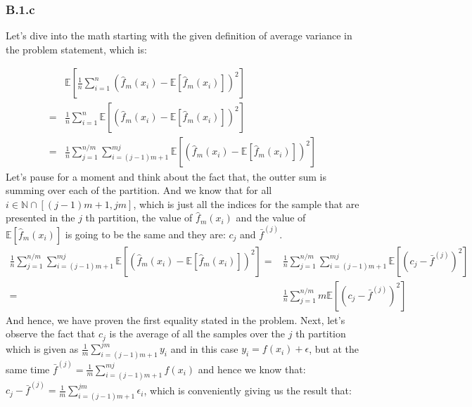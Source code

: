 \documentclass[]{article}
\begin{document}
	\subsubsection*{B.1.c}
		\hspace{1.1em}
		Let's dive into the math starting with the given definition of average variance in the problem statement, which is: 
		\par
		\begin{align*}\tag{B.1.c.1}\label{eqn:B.1.c.1}
			& \mathbb{E}\left[
				\frac{1}{n}
				\sum_{i = 1}^{n}\left(
					\hat{f}_m(x_i) - \mathbb{E}\left[\hat{f}_m(x_i)\right]
				\right)^2
			\right] 
			\\=& 
			\frac{1}{n}
			\sum_{i = 1}^{n}
			\mathbb{E}\left[
				\left(
					\hat{f}_m(x_i) - \mathbb{E}\left[\hat{f}_m(x_i)\right]
				\right)^2
			\right]
			\\
			=&
			\frac{1}{n}\sum_{j = 1}^{n/m}\sum_{i = (j - 1)m + 1}^{mj}
			\mathbb{E}\left[
				\left(
					\hat{f}_m(x_i) - \mathbb{E}\left[\hat{f}_m(x_i)\right]
				\right)^2
			\right]
		\end{align*}
		Let's pause for a moment and think about the fact that, the outter sum is summing over each of the partition. And we know that for all $i\in \mathbb{N}\cap[(j - 1)m + 1, jm]$, which is just all the indices for the sample that are presented in the $j$ th partition, the value of $\hat{f}_m(x_i)$ and the value of $\mathbb{E}\left[\hat{f}_m(x_i)\right]$ is going to be the same and they are: $c_j$ and $\bar{f}^{(j)}$. 
		\begin{align*}\tag{B.1.c.2}\label{eqn:B.1.c.2}
			\frac{1}{n}\sum_{j = 1}^{n/m}\sum_{i = (j - 1)m + 1}^{mj}
			\mathbb{E}\left[
				\left(
					\hat{f}_m(x_i) - \mathbb{E}\left[\hat{f}_m(x_i)\right]
				\right)^2
			\right] 
			= &
			\frac{1}{n}\sum_{j = 1}^{n/m}\sum_{i = (j - 1)m + 1}^{mj}
			\mathbb{E}\left[
				\left(
					c_j - \bar{f}^{(j)}
				\right)^2
			\right] 
			\\
			=& 
			\frac{1}{n}\sum_{j = 1}^{n/m}
				m\mathbb{E}\left[
					(c_j - \bar{f}^{(j)})^2
				\right] 
		\end{align*}
		And hence, we have proven the first equality stated in the problem. Next, let's observe the fact that $c_j$ is the average of all the samples over the $j$ th partition which is given as $\frac{1}{m}\sum_{i = (j - 1)m + 1}^{jm}y_i$ and in this case $y_i = f(x_i) + \epsilon$, but at the same time $\bar{f}^{(j)} = \frac{1}{m}\sum_{i = (j - 1)m + 1}^{mj}f(x_i)$ and hence we know that: $c_j - \bar{f}^{(j)} = \frac{1}{m}\sum_{i = (j - 1)m + 1}^{jm}\epsilon_i$, which is conveniently giving us the result that: 
\end{document}
